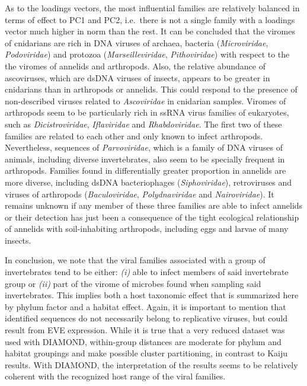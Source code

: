 \documentclass[
  openany]{book}
\begin{document}
As to the loadings vectors, the most influential families are relatively balanced in terms of effect to PC1 and PC2, i.e.~there is not a single family with a loadings vector much higher in norm than the rest. It can be concluded that the viromes of cnidarians are rich in DNA viruses of archaea, bacteria (\emph{Microviridae}, \emph{Podoviridae}) and protozoa (\emph{Marseilleviridae}, \emph{Pithoviridae}) with respect to the the viromes of annelids and arthropods. Also, the relative abundance of ascoviruses, which are dsDNA viruses of insects, appears to be greater in cnidarians than in arthropods or annelids. This could respond to the presence of non-described viruses related to \emph{Ascoviridae} in cnidarian samples. Viromes of arthropods seem to be particularly rich in ssRNA virus families of eukaryotes, such as \emph{Dicistroviridae}, \emph{Iflaviridae} and \emph{Rhabdoviridae}. The first two of these families are related to each other and only known to infect arthropods. Nevertheless, sequences of \emph{Parvoviridae}, which is a family of DNA viruses of animals, including diverse invertebrates, also seem to be specially frequent in arthropods. Families found in differentially greater proportion in annelids are more diverse, including dsDNA bacteriophages (\emph{Siphoviridae}), retroviruses and viruses of arthropods (\emph{Baculoviridae}, \emph{Polydnaviridae} and \emph{Nairoviridae}). It remains unknown if any member of these three families are able to infect annelids or their detection has just been a consequence of the tight ecological relationship of annelids with soil-inhabiting arthropods, including eggs and larvae of many insects.

In conclusion, we note that the viral families associated with a group of invertebrates tend to be either: \emph{(i)} able to infect members of said invertebrate group or \emph{(ii)} part of the virome of microbes found when sampling said invertebrates. This implies both a host taxonomic effect that is summarized here by phylum factor and a habitat effect. Again, it is important to mention that identified sequences do not necessarily belong to replicative viruses, but could result from EVE expression. While it is true that a very reduced dataset was used with DIAMOND, within-group distances are moderate for phylum and habitat groupings and make possible cluster partitioning, in contrast to Kaiju results. With DIAMOND, the interpretation of the results seems to be relatively coherent with the recognized host range of the viral families.
\end{document}
